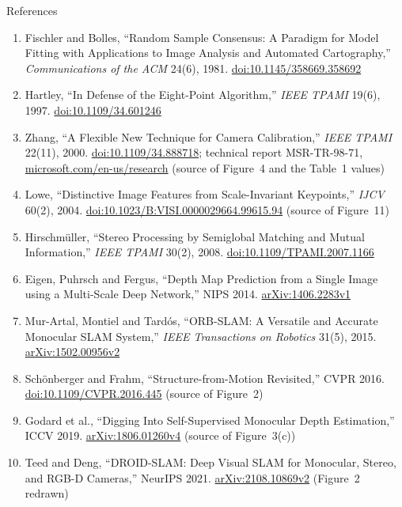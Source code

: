 \begin{frame}[allowframebreaks]{References}
  \scriptsize\setlength{\parskip}{0pt}
  \begin{enumerate}\itemsep0.2em
    \item Fischler and Bolles, ``Random Sample Consensus: A Paradigm for Model Fitting with Applications to Image Analysis and Automated Cartography,'' \emph{Communications of the ACM} 24(6), 1981. \href{https://doi.org/10.1145/358669.358692}{doi:10.1145/358669.358692}
    \item Hartley, ``In Defense of the Eight-Point Algorithm,'' \emph{IEEE TPAMI} 19(6), 1997. \href{https://doi.org/10.1109/34.601246}{doi:10.1109/34.601246}
    \item Zhang, ``A Flexible New Technique for Camera Calibration,'' \emph{IEEE TPAMI} 22(11), 2000. \href{https://doi.org/10.1109/34.888718}{doi:10.1109/34.888718}; technical report MSR-TR-98-71, \href{https://www.microsoft.com/en-us/research/wp-content/uploads/2016/02/tr98-71.pdf}{microsoft.com/en-us/research} (source of Figure~4 and the Table~1 values)
    \item Lowe, ``Distinctive Image Features from Scale-Invariant Keypoints,'' \emph{IJCV} 60(2), 2004. \href{https://doi.org/10.1023/B:VISI.0000029664.99615.94}{doi:10.1023/B:VISI.0000029664.99615.94} (source of Figure~11)
    \item Hirschm\"uller, ``Stereo Processing by Semiglobal Matching and Mutual Information,'' \emph{IEEE TPAMI} 30(2), 2008. \href{https://doi.org/10.1109/TPAMI.2007.1166}{doi:10.1109/TPAMI.2007.1166}
    \item Eigen, Puhrsch and Fergus, ``Depth Map Prediction from a Single Image using a Multi-Scale Deep Network,'' NIPS 2014. \href{https://arxiv.org/abs/1406.2283v1}{arXiv:1406.2283v1}
    \item Mur-Artal, Montiel and Tard\'os, ``ORB-SLAM: A Versatile and Accurate Monocular SLAM System,'' \emph{IEEE Transactions on Robotics} 31(5), 2015. \href{https://arxiv.org/abs/1502.00956v2}{arXiv:1502.00956v2}
    \item Sch\"onberger and Frahm, ``Structure-from-Motion Revisited,'' CVPR 2016. \href{https://doi.org/10.1109/CVPR.2016.445}{doi:10.1109/CVPR.2016.445} (source of Figure~2)
    \item Godard et al., ``Digging Into Self-Supervised Monocular Depth Estimation,'' ICCV 2019. \href{https://arxiv.org/abs/1806.01260v4}{arXiv:1806.01260v4} (source of Figure~3(c))
    \item Teed and Deng, ``DROID-SLAM: Deep Visual SLAM for Monocular, Stereo, and RGB-D Cameras,'' NeurIPS 2021. \href{https://arxiv.org/abs/2108.10869v2}{arXiv:2108.10869v2} (Figure~2 redrawn)

\end{enumerate}
\end{frame}
